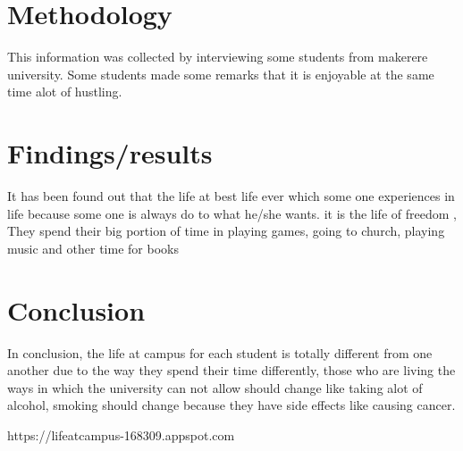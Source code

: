 \documentclass[a4paper,12pt]{report}
\begin{document}
\section{\LARGE Methodology}
This information was collected by interviewing some students from makerere university. Some students made some remarks that it is enjoyable at the same time alot of hustling. 

\section{{\LARGE Findings/results}}
It has been found out that the life at best life ever which some one experiences in life because some one is always do to what he/she wants. it is the life of freedom ,  They spend their big portion of time in playing games, going to church, playing music and other time for books

\section{{\LARGE Conclusion}}
In conclusion, the life at campus for each student is totally different from one another due to the way they spend their time differently, those who are living the ways in which the university can not allow should change like taking alot of alcohol, smoking should change because they have side effects like causing cancer.

\begin{thebibliography}{9}

  https://lifeatcampus-168309.appspot.com

\end{thebibliography}


 
\end{document}
